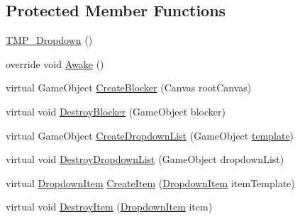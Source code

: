 \subsection*{Protected Member Functions}
\begin{DoxyCompactItemize}
\item 
\mbox{\hyperlink{class_t_m_pro_1_1_t_m_p___dropdown_a3cc2f5c541cb61a358c92d292128551d}{T\+M\+P\+\_\+\+Dropdown}} ()
\item 
override void \mbox{\hyperlink{class_t_m_pro_1_1_t_m_p___dropdown_a9f434a91461de7a9b709bce0a4f31bd7}{Awake}} ()
\item 
virtual Game\+Object \mbox{\hyperlink{class_t_m_pro_1_1_t_m_p___dropdown_aaaca2aca289284551cb768b4de31123d}{Create\+Blocker}} (Canvas root\+Canvas)
\item 
virtual void \mbox{\hyperlink{class_t_m_pro_1_1_t_m_p___dropdown_a1bf1e08099436573116705840810dc3f}{Destroy\+Blocker}} (Game\+Object blocker)
\item 
virtual Game\+Object \mbox{\hyperlink{class_t_m_pro_1_1_t_m_p___dropdown_ae6ae9d5a3c350ec81e2108ad6ccf254e}{Create\+Dropdown\+List}} (Game\+Object \mbox{\hyperlink{class_t_m_pro_1_1_t_m_p___dropdown_a6ab2bc63f80032f0d78d195fac730d5f}{template}})
\item 
virtual void \mbox{\hyperlink{class_t_m_pro_1_1_t_m_p___dropdown_adf7f42bd73c1274367a38b60596f4645}{Destroy\+Dropdown\+List}} (Game\+Object dropdown\+List)
\item 
virtual \mbox{\hyperlink{class_t_m_pro_1_1_t_m_p___dropdown_1_1_dropdown_item}{Dropdown\+Item}} \mbox{\hyperlink{class_t_m_pro_1_1_t_m_p___dropdown_a267fae8bb58d334e133686395b615bf1}{Create\+Item}} (\mbox{\hyperlink{class_t_m_pro_1_1_t_m_p___dropdown_1_1_dropdown_item}{Dropdown\+Item}} item\+Template)
\item 
virtual void \mbox{\hyperlink{class_t_m_pro_1_1_t_m_p___dropdown_a1a885c39fedfa1f678c50f8d3c4f55b8}{Destroy\+Item}} (\mbox{\hyperlink{class_t_m_pro_1_1_t_m_p___dropdown_1_1_dropdown_item}{Dropdown\+Item}} item)
\end{DoxyCompactItemize}
